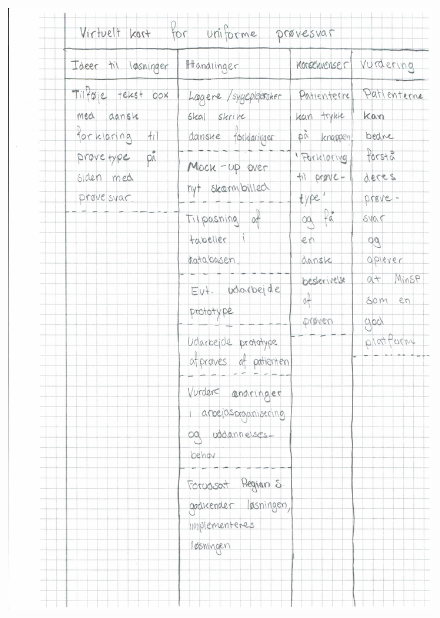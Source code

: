 \begin{figure}[H]
	\centering
	\includegraphics[angle=0, height=1.05\textheight]{Materials/DV_Kort6.pdf}
	\label{fig:DVkort6}
\end{figure}